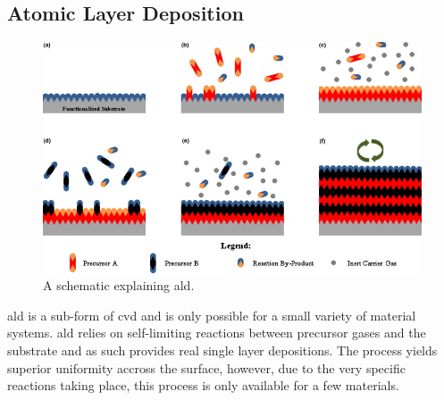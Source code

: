 \subsection{Atomic Layer Deposition}
\begin{figure}
    \includegraphics[width=\textwidth]{03_fabrication/fig/atomic_layer_deposition.jpg}
    \caption{A schematic explaining \gls{ald}\cite{Johnson2014}.}
    \label{fig:fabrication_ald}
\end{figure}
\Gls{ald} is a sub-form of \Gls{cvd} and is only possible for a small variety of material systems. \Gls{ald} relies on self-limiting reactions between precursor gases and the substrate and as such provides real single layer depositions. The process yields superior uniformity accross the surface, however, due to the very specific reactions taking place, this process is only available for a few materials.
